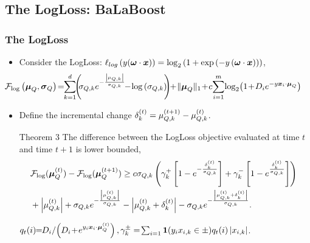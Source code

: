 \documentclass[mathserif]{beamer}
\begin{document}
\subsection{The LogLoss: BaLaBoost}
\begin{frame}
\frametitle{The LogLoss}
\vspace{-0.1cm}
\begin{itemize}
\item Consider the LogLoss: $\ell_{log}\left({y ({\boldsymbol{\omega}} \cdot {\boldsymbol{x}})}\right) = \log_2{\left({
    1+\exp{\left({-y \left({ {\boldsymbol{\omega}}\cdot {\boldsymbol{x}}}\right) }\right) } }\right)}$,
\begin{align*}
\!\!\!\!\!\!\!\!\!\!\!\F_{\log} &\paren{\vmuq,\vsigmaq}\!=\!\!
\sum_{k=1}^{d}\!\! \paren{\!\!\sigmaqi{k}e^{-\frac{\abs{\muqi{k}}}{\sigmaqi{k}}}\!\!-\!\log{ \paren{
      \sigmaqi{k} } } \!\!}\!\!+\!\Vert \vmuq
\Vert_1\!+\! c\!\sum_{i =1}^m \! \log_2\!\paren{1\!+\!D_i e^{- y  \vxii \cdot \vmuq}}
\end{align*}
\item Define the incremental change $\delta_k ^{(t)} =
\mu_{Q,k}^{(t+1)}-\mu_{Q,k}^{(t)}$.
\vspace{-0.15cm}
\begin{block}{Theorem 3}
The
difference between
the LogLoss objective %
evaluated at time $t$ and time $t+1$ is lower bounded,
\vspace{-0.6cm}
\begin{align*}
&{\mathcal{F}}_{\log}({\boldsymbol{\mu}}_Q^{(t)})
-{\mathcal{F}}_{\log}({\boldsymbol{\mu}}_Q^{(t+1)}) \geq  c\sigma_{Q,k} \left({\gamma_k^{+}\left[{1-e^{-\frac{\delta_k ^{(t)}}{\sigma_{Q,k}}}}\right]+\gamma_k^{-}\left[{1-e^{\frac{\delta_k ^{(t)}}{\sigma_{Q,k}}}}\right]}\right)  ~
 \\  &  +\left\vert{\mu_{Q,k}^{(t)} }\right\vert+\sigma_{Q,k} e^{-\frac{\left\vert{\mu_{Q,k}^{(t)}
      }\right\vert}{\sigma_{Q,k}}}-\left\vert{\mu_{Q,k}^{(t)} +\delta_k^{(t)}
  }\right\vert-\sigma_{Q,k} e^{-\frac{\left\vert{\mu_{Q,k}^{(t)} +\delta_k^{(t)}
      }\right\vert}{\sigma_{Q,k}}}.
\end{align*}

%
\vspace{-0.2cm}
  $q_t(i)\!\! =\!\! {D_i}/\!\paren{D_i\!+\!e^{\yii  \vxii \cdot \vmuq^{(t)} }},\gamma_k^{\pm} =\! \sum_{i=1}\mb{1}(\yii x_{i,k}\in\pm)q_t(i)\abs{x_{i,k}}$.
\vspace{-0.1cm}
\end{block}
\end{itemize}
\end{frame}
\end{document}
